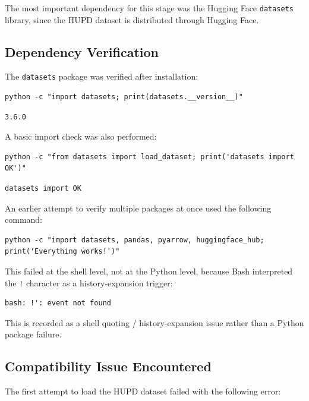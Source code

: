 \documentclass[11pt]{article}
\begin{document}
\noindent The most important dependency for this stage was the Hugging Face \texttt{datasets} library, since the HUPD dataset is distributed through Hugging Face.

\subsection{Dependency Verification}

The \texttt{datasets} package was verified after installation:

\begin{lstlisting}
python -c "import datasets; print(datasets.__version__)"
\end{lstlisting}

\begin{lstlisting}
3.6.0
\end{lstlisting}

\noindent A basic import check was also performed:

\begin{lstlisting}
python -c "from datasets import load_dataset; print('datasets import OK')"
\end{lstlisting}

\begin{lstlisting}
datasets import OK
\end{lstlisting}

\noindent An earlier attempt to verify multiple packages at once used the following command:

\begin{lstlisting}
python -c "import datasets, pandas, pyarrow, huggingface_hub; print('Everything works!')"
\end{lstlisting}

\noindent This failed at the shell level, not at the Python level, because Bash interpreted the \texttt{!} character as a history-expansion trigger:

\begin{lstlisting}
bash: !': event not found
\end{lstlisting}

\noindent This is recorded as a shell quoting / history-expansion issue rather than a Python package failure.

\subsection{Compatibility Issue Encountered}

The first attempt to load the HUPD dataset failed with the following error:
\end{document}
